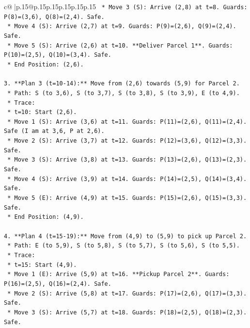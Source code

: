 \documentclass{article}
\begin{document}
{\begin{supertabular}{c@{$\;$}|p{.15\linewidth}@{}p{.15\linewidth}p{.15\linewidth}p{.15\linewidth}p{.15\linewidth}p{.15\linewidth}}
{{{\texttt{        *   Move 3 (S): Arrive (2,8) at t=8. Guards: P(8)=(3,6), Q(8)=(2,4). Safe.} \\
\texttt{        *   Move 4 (S): Arrive (2,7) at t=9. Guards: P(9)=(2,6), Q(9)=(2,4). Safe.} \\
\texttt{        *   Move 5 (S): Arrive (2,6) at t=10. **Deliver Parcel 1**. Guards: P(10)=(2,5), Q(10)=(3,4). Safe.} \\
\texttt{    *   End Position: (2,6).} \\
\\ 
\texttt{3.  **Plan 3 (t=10{-}14):** Move from (2,6) towards (5,9) for Parcel 2.} \\
\texttt{    *   Path: S (to 3,6), S (to 3,7), S (to 3,8), S (to 3,9), E (to 4,9).} \\
\texttt{    *   Trace:} \\
\texttt{        *   t=10: Start (2,6).} \\
\texttt{        *   Move 1 (S): Arrive (3,6) at t=11. Guards: P(11)=(2,6), Q(11)=(2,4). Safe (I am at 3,6, P at 2,6).} \\
\texttt{        *   Move 2 (S): Arrive (3,7) at t=12. Guards: P(12)=(3,6), Q(12)=(3,3). Safe.} \\
\texttt{        *   Move 3 (S): Arrive (3,8) at t=13. Guards: P(13)=(2,6), Q(13)=(2,3). Safe.} \\
\texttt{        *   Move 4 (S): Arrive (3,9) at t=14. Guards: P(14)=(2,5), Q(14)=(3,4). Safe.} \\
\texttt{        *   Move 5 (E): Arrive (4,9) at t=15. Guards: P(15)=(2,6), Q(15)=(3,3). Safe.} \\
\texttt{    *   End Position: (4,9).} \\
\\ 
\texttt{4.  **Plan 4 (t=15{-}19):** Move from (4,9) to (5,9) to pick up Parcel 2.} \\
\texttt{    *   Path: E (to 5,9), S (to 5,8), S (to 5,7), S (to 5,6), S (to 5,5).} \\
\texttt{    *   Trace:} \\
\texttt{        *   t=15: Start (4,9).} \\
\texttt{        *   Move 1 (E): Arrive (5,9) at t=16. **Pickup Parcel 2**. Guards: P(16)=(2,5), Q(16)=(2,4). Safe.} \\
\texttt{        *   Move 2 (S): Arrive (5,8) at t=17. Guards: P(17)=(2,6), Q(17)=(3,3). Safe.} \\
\texttt{        *   Move 3 (S): Arrive (5,7) at t=18. Guards: P(18)=(2,5), Q(18)=(2,3). Safe.} \\
}}}
\end{supertabular}}
\end{document}
